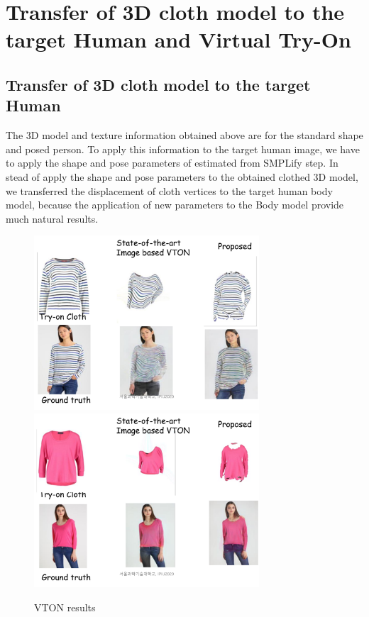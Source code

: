 \section{Transfer of 3D cloth model to the target Human and Virtual Try-On }  \label{section:clothtransfer}


\subsection{Transfer of 3D cloth model to the target Human} 

The 3D model and texture information obtained above are for the standard shape and posed person. To apply this information to the target human image, we have to apply the shape and pose parameters of estimated from SMPLify\cite{Bogo2016SMPLify} step.  In stead of apply the shape and pose parameters to the obtained clothed 3D model, we transferred the displacement of cloth vertices to the target human body model, because the application of new parameters to the Body model provide much natural results.      


\begin{figure}[t]
\centering
\includegraphics[height=6.5cm, scale=1]{figures/vton_result1.png} 
\includegraphics[height=6.5cm, scale=1]{figures/vton_result2.png} 
\caption{VTON results}
\label{fig:vtonresults}
\end{figure}


